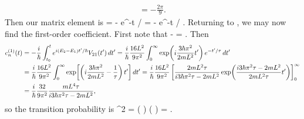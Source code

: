 \begin{solution}
\begin{align*}
		= -\frac{2\pi}{9}.
	\end{align*}
	Then our matrix element is
	\beq
		 = - e^{-t / \tau} 
		= - e^{-t / \tau}.
	\eeq
	 Returning to , we may now find the first-order coefficient.  First note that
	 \beq
	 	\Ew - \Eq = .
	 \eeq
	 Then
	 \begin{align*}
	 	c_n^{(1)}(t) &= -\frac{i}{\hbar} \int_{t_0}^t e^{i (E_2 - E_1) t' / \hbar} V_{2 1}(t') \dd{t'}
	 	= \frac{i}{\hbar} \frac{16 L^2}{9 \pi^2} \int_0^\infty \exp(i \frac{3 \hbar \pi^2}{2 m L^2} t')  \, e^{-t' / \tau} \dd{t'} \\
	 	&= \frac{i}{\hbar} \frac{16 L^2}{9 \pi^2} \int_0^\infty \exp[ \left( i \frac{3 \hbar \pi^2}{2 m L^2} - \frac{1}{\tau} \right) t'] \dd{t'}
	 	= \frac{i}{\hbar} \frac{16 L^2}{9 \pi^2} \left[ \frac{2 m L^2 \tau}{i 3 \hbar \pi^2 \tau - 2 m L^2} \exp(\frac{i 3 \hbar \pi^2 \tau - 2 m L^2}{2 m L^2 \tau} t') \right]_0^\infty \\
	 	&= \frac{i}{\hbar} \frac{32}{9 \pi^2} \frac{m L^4 \tau}{i 3 \hbar \pi^2 \tau - 2 m L^2},
	 \end{align*}
	 so the transition probability is
	 \beq
	 	\abs*{\cnqt}^2 = \left(    \right) \left(    \right)
	 	=  .
	 \eeq
\end{solution}
